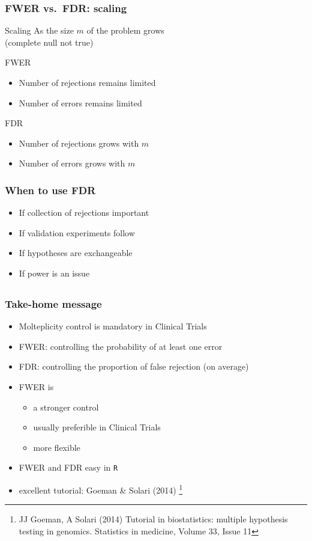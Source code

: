 \documentclass[xcolor={dvipsnames}]{beamer}
\newcommand{\bb}[1]{\begin{block}{#1}}
\newcommand{\eb}{\end{block}}
\newcommand{\bi}{\begin {itemize}}
\newcommand{\ei}{\end{itemize}}
\newcommand{\bfr}[1]{\begin{frame} \frametitle{#1}}
\begin{document}
\bfr{FWER vs.\ FDR: scaling}
  \bb{Scaling}
    As the size $m$ of the problem grows \\(complete null not true)
  \eb
  \bb{FWER}
    \bi
      \item Number of rejections remains limited
      \item Number of errors remains limited
    \ei
  \eb
  \bb{FDR}
    \bi
      \item Number of rejections grows with $m$
      \item Number of errors grows with $m$
    \ei
  \eb
\end{frame}


\bfr{When to use FDR}
    \bi
      \item If collection of rejections important
      \item If validation experiments follow
      \item If hypotheses are exchangeable
      \item If power is an issue
    \ei
\end{frame}


\subsection{}
\bfr{Take-home message}
\bi 
\item Molteplicity control is mandatory in Clinical Trials 
\item FWER: controlling the probability of at least one error
\item FDR:  controlling the  proportion of false rejection (on average)
\item FWER is 
\bi
\item a stronger control
\item usually preferible in Clinical Trials
\item more flexible
\ei
\item FWER and FDR  easy in {\tt R}
\item excellent tutorial: Goeman \& Solari (2014) \footnote{
JJ Goeman, A Solari (2014) Tutorial in biostatistics: multiple hypothesis testing in genomics. Statistics in medicine, Volume 33, Issue 11}
\ei
\end{frame}
\end{document}
